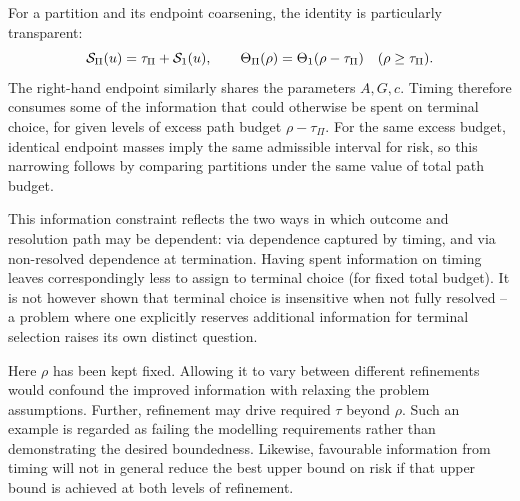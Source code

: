 For a partition and its endpoint coarsening, the identity is particularly transparent:
\begin{equation}\label{eq:effectivebudget}
 \mathcal S_\Pi(u)=\tau_\Pi+\mathcal S_1(u),\qquad
 \Theta_\Pi(\rho)=\Theta_1(\rho-\tau_\Pi)\quad(\rho\ge\tau_\Pi).
\end{equation}
The right-hand endpoint similarly shares the parameters $A,G,c$. Timing therefore consumes some of the information that could otherwise be spent on terminal choice, for given levels of excess path budget $\rho - \tau_\Pi$. For the same excess budget, identical endpoint masses imply the same admissible interval for risk, so this narrowing follows by comparing partitions under the same value of total path budget.

This information constraint reflects the two ways in which outcome and resolution path may be dependent: via dependence captured by timing, and via non-resolved dependence at termination. Having spent information on timing leaves correspondingly less to assign to terminal choice (for fixed total budget). It is not however shown that terminal choice is insensitive when not fully resolved -- a problem where one explicitly reserves additional information for terminal selection raises its own distinct question.

Here $\rho$ has been kept fixed. Allowing it to vary between different refinements would confound the improved information with relaxing the problem assumptions. Further, refinement may drive required $\tau$ beyond $\rho$. Such an example is regarded as failing the modelling requirements rather than demonstrating the desired boundedness. Likewise, favourable information from timing will not in general reduce the best upper bound on risk if that upper bound is achieved at both levels of refinement.

